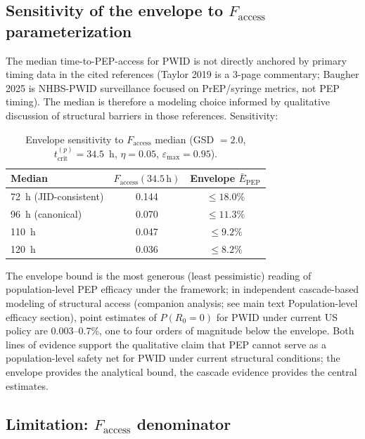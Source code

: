 \documentclass[11pt]{article}
\theoremstyle{definition}
\theoremstyle{remark}
\newcommand{\Ebarpep}{\bar{E}_{\text{PEP}}}
\newcommand{\Faccess}{F_{\text{access}}}
\newcommand{\tcrit}{t_{\text{crit}}}
\newcommand{\emax}{\varepsilon_{\max}}
\begin{document}
\subsection{Sensitivity of the envelope to \texorpdfstring{$\Faccess$}{Faccess} parameterization}

The median time-to-PEP-access for PWID is not directly anchored by primary timing data in the cited references (Taylor 2019\cite{taylor2019_si} is a 3-page commentary; Baugher 2025\cite{baugher2025_si} is NHBS-PWID surveillance focused on PrEP/syringe metrics, not PEP timing). The median is therefore a modeling choice informed by qualitative discussion of structural barriers in those references. Sensitivity:

\begin{table}[H]
\centering
\small
\caption{Envelope sensitivity to $\Faccess$ median (GSD $= 2.0$, $\tcrit^{(p)} = 34.5$~h, $\eta = 0.05$, $\emax = 0.95$).}
\begin{tabular}{@{}lcc@{}}
\toprule
\textbf{Median} & \textbf{$\Faccess(34.5\,\text{h})$} & \textbf{Envelope $\Ebarpep$} \\
\midrule
72~h (JID-consistent) & 0.144 & $\leq 18.0\%$ \\
96~h (canonical)      & 0.070 & $\leq 11.3\%$ \\
110~h                 & 0.047 & $\leq 9.2\%$  \\
120~h                 & 0.036 & $\leq 8.2\%$  \\
\bottomrule
\end{tabular}
\end{table}

The envelope bound is the most generous (least pessimistic) reading of population-level PEP efficacy under the framework; in independent cascade-based modeling of structural access (companion analysis; see main text Population-level efficacy section), point estimates of $P(R_{0}=0)$ for PWID under current US policy are 0.003--0.7\%, one to four orders of magnitude below the envelope. Both lines of evidence support the qualitative claim that PEP cannot serve as a population-level safety net for PWID under current structural conditions; the envelope provides the analytical bound, the cascade evidence provides the central estimates.

\subsection{Limitation: \texorpdfstring{$\Faccess$}{Faccess} denominator}
\end{document}
